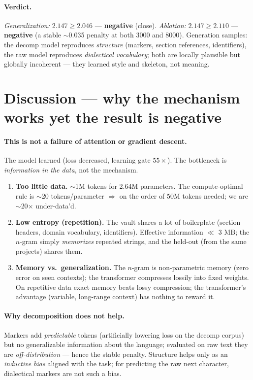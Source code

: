 \documentclass[11pt]{article}
\begin{document}
\paragraph{Verdict.} \emph{Generalization:} $2.147 \geq 2.046$ --- \textbf{negative} (close). \emph{Ablation:}
$2.147 \geq 2.110$ --- \textbf{negative} (a stable $\sim$0.035 penalty at both 3000 and 8000). Generation samples:
the decomp model reproduces \emph{structure} (markers, section references, identifiers), the raw model reproduces
\emph{dialectical vocabulary}; both are locally plausible but globally incoherent --- they learned style and
skeleton, not meaning.

\section{Discussion --- why the mechanism works yet the result is negative}
\paragraph{This is not a failure of attention or gradient descent.} The model learned (loss decreased, learning
gate $55\times$). The bottleneck is \emph{information in the data}, not the mechanism.
\begin{enumerate}
  \item \textbf{Too little data.} $\sim$1M tokens for 2.64M parameters. The compute-optimal rule is $\sim$20
  tokens/parameter \cite{chinchilla} $\Rightarrow$ on the order of $50$M tokens needed; we are $\sim$20$\times$
  under-data'd.
  \item \textbf{Low entropy (repetition).} The vault shares a lot of boilerplate (section headers, domain
  vocabulary, identifiers). Effective information $\ll$ 3 MB; the $n$-gram simply \emph{memorizes} repeated strings,
  and the held-out (from the same projects) shares them.
  \item \textbf{Memory vs.\ generalization.} The $n$-gram is non-parametric memory (zero error on seen contexts);
  the transformer compresses lossily into fixed weights. On repetitive data exact memory beats lossy compression;
  the transformer's advantage (variable, long-range context) has nothing to reward it.
\end{enumerate}

\paragraph{Why decomposition does not help.} Markers add \emph{predictable} tokens (artificially lowering loss on
the decomp corpus) but no generalizable information about the language; evaluated on raw text they are
\emph{off-distribution} --- hence the stable penalty. Structure helps only as an \emph{inductive bias} aligned with
the task; for predicting the raw next character, dialectical markers are not such a bias.
\end{document}
